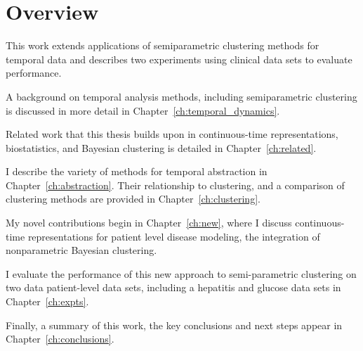 \section{Overview}
This work extends applications of semiparametric clustering methods for temporal data and describes two experiments using clinical data sets to evaluate performance.

A background on temporal analysis methods, including semiparametric clustering is discussed in more detail in Chapter~\ref{ch:temporal_dynamics}.

Related work that this thesis builds upon in continuous-time representations, biostatistics, and Bayesian clustering is detailed in Chapter~\ref{ch:related}.




 I describe the variety of methods for temporal abstraction in Chapter~\ref{ch:abstraction}.  Their relationship to clustering, and a comparison of clustering methods are provided in Chapter~\ref{ch:clustering}.

 My novel contributions begin in Chapter~\ref{ch:new}, where I discuss continuous-time representations for patient level disease modeling, the integration of nonparametric Bayesian clustering.

 I evaluate the performance of this new approach to semi-parametric clustering on two data patient-level data sets, including a hepatitis and glucose data sets in Chapter~\ref{ch:expts}.

Finally, a summary of this work, the key conclusions and next steps appear in Chapter~\ref{ch:conclusions}.
